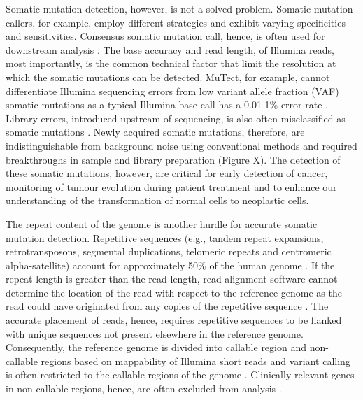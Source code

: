 Somatic mutation detection, however, is not a solved problem. Somatic mutation callers, for example, employ different strategies and exhibit varying specificities and sensitivities. Consensus somatic mutation call, hence, is often used for downstream analysis \cite{Bailey2020-ou}. The base accuracy and read length, of Illumina reads, most importantly, is the common technical factor that limit the resolution at which the somatic mutations can be detected. MuTect, for example, cannot differentiate Illumina sequencing errors from low variant allele fraction (VAF) somatic mutations as a typical Illumina base call has a 0.01-1\% error rate \cite{Cibulskis2013-gw}. Library errors, introduced upstream of sequencing, is also often misclassified as somatic mutations \cite{Costello2013-cz, Chen2017-ba, Abascal2021-pk}. Newly acquired somatic mutations, therefore, are indistinguishable from background noise using conventional methods and required breakthroughs in sample and library preparation (Figure X). The detection of these somatic mutations, however, are critical for early detection of cancer, monitoring of tumour evolution during patient treatment and to enhance our understanding of the transformation of normal cells to neoplastic cells. 

The repeat content of the genome is another hurdle for accurate somatic mutation detection. Repetitive sequences (e.g., tandem repeat expansions, retrotransposons, segmental duplications, telomeric repeats and centromeric alpha-satellite) account for approximately 50\% of the human genome \cite{Lander2001-du}. If the repeat length is greater than the read length, read alignment software cannot determine the location of the read with respect to the reference genome as the read could have originated from any copies of the repetitive sequence \cite{Li2008-dt}. The accurate placement of reads, hence, requires repetitive sequences to be flanked with unique sequences not present elsewhere in the reference genome. Consequently, the reference genome is divided into callable region and non-callable regions based on mappability of Illumina short reads and variant calling is often restricted to the callable regions of the genome \cite{1000_Genomes_Project_Consortium2012-rj}. Clinically relevant genes in non-callable regions, hence, are often excluded from analysis \cite{Wagner2022-ph}.

